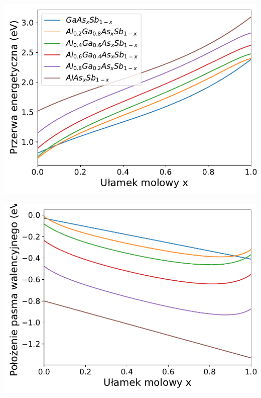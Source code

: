 \documentclass[12pt,openany,a4paper]{book}
\begin{document}
\begin{minipage}[t]{0.5\textwidth}
	\includegraphics[width = \linewidth]{Figures/quaternary/quat_eg_y.pdf}\label{fig:quat_Eg_y}
\end{minipage}
\begin{minipage}[t]{0.5\textwidth}
	\includegraphics[width = \linewidth]{Figures/quaternary/quat_vbo_y.pdf}\label{fig:quat_vbo_y}
\end{minipage}
\end{document}
